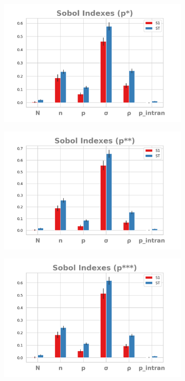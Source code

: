 \documentclass{article}
\begin{document}
     
    \begin{figure}[H]
  \centering
    \begin{subfigure}[b]{0.45\textwidth}
      \includegraphics[width=\textwidth]{img/sobolpstar1.png}
    \end{subfigure}
    \begin{subfigure}[b]{0.45\textwidth}
      \includegraphics[width=\textwidth]{img/sobolpstar2.png}
     \end{subfigure}
     \begin{subfigure}[b]{0.5\textwidth}
       \includegraphics[width=\textwidth]{img/sobolpstar3.png}

\end{subfigure}
\end{figure}
\end{document}
